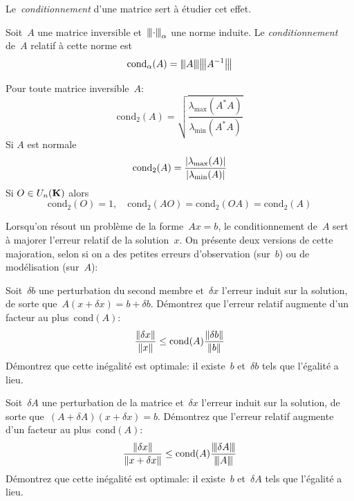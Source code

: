 Le~\emph{conditionnement} d'une matrice sert à étudier cet effet.

\begin{definition}
	Soit~$A$ une matrice inversible et~${\left\vert\kern-0.25ex\left\vert\kern-0.25ex\left\vert \cdot \right\vert\kern-0.25ex\right\vert\kern-0.25ex\right\vert}_\alpha$ une norme induite.  Le
	\emph{conditionnement} de~$A$ relatif à cette norme est
	\[
		\mathrm{cond}_\alpha(A) = {\left\vert\kern-0.25ex\left\vert\kern-0.25ex\left\vert A \right\vert\kern-0.25ex\right\vert\kern-0.25ex\right\vert}{\left\vert\kern-0.25ex\left\vert\kern-0.25ex\left\vert A^{-1} \right\vert\kern-0.25ex\right\vert\kern-0.25ex\right\vert}
	\]
\end{definition}

\begin{proposition} Pour toute matrice
	inversible~$A$:
\begin{displaymath}
\mathrm{cond}_2(A) = \sqrt{\frac{\lambda_{\max}(A^*A)}{\lambda_{\min}(A^*A)}}
\end{displaymath}
Si $A$ est normale
\begin{displaymath}
\mathrm{cond}_2(A) = \frac{\left|\lambda_{\max}(A)\right|}{\left|\lambda_{\min}(A)\right|}
\end{displaymath}
Si $O \in U_n(\mathbf{K})$ alors
\begin{displaymath}
\mathrm{cond}_2(O) = 1, \quad \mathrm{cond}_2(AO) = \mathrm{cond}_2(OA) = \mathrm{cond}_2(A)
\end{displaymath}
\end{proposition}

Lorsqu'on résout un problème de la forme~$Ax=b$, le conditionnement de~$A$
sert à majorer l'erreur relatif de la solution~$x$.  On présente deux
versions de cette majoration, selon si on a des petites erreurs d'observation
(sur~$b$) ou de modélisation (sur~$A$):

\begin{exercice}
	Soit~$\delta b$ une perturbation du second membre et~$\delta x$ l'erreur
	induit sur la solution, de sorte que~$A(x+\delta x)=b+\delta b$.  Démontrez
	que l'erreur relatif augmente d'un facteur au plus~$\mathrm{cond}(A)$:
	\[
		\frac{\left\|\delta x\right\|}{\left\|x\right\|}
		\le
		\mathrm{cond}(A)
		\frac{\left\|\delta b\right\|}{\left\|b\right\|}
	\]
	Démontrez que cette inégalité est optimale: il existe~$b$ et~$\delta
	b$ tels que l'égalité a lieu.
\end{exercice}


\begin{exercice}
	Soit~$\delta A$ une perturbation de la matrice et~$\delta x$ l'erreur
	induit sur la solution, de sorte que~$(A+\delta A)(x+\delta x)=b$.  Démontrez
	que l'erreur relatif augmente d'un facteur au plus~$\mathrm{cond}(A)$:
	\[
		\frac{\left\|\delta x\right\|}{\left\|x+\delta x\right\|}
		\le
		\mathrm{cond}(A)
		\frac{{\left\vert\kern-0.25ex\left\vert\kern-0.25ex\left\vert \delta A \right\vert\kern-0.25ex\right\vert\kern-0.25ex\right\vert}}{{\left\vert\kern-0.25ex\left\vert\kern-0.25ex\left\vert A \right\vert\kern-0.25ex\right\vert\kern-0.25ex\right\vert}}
	\]
	Démontrez que cette inégalité est optimale: il existe~$b$ et~$\delta
	A$ tels que l'égalité a lieu.
\end{exercice}

